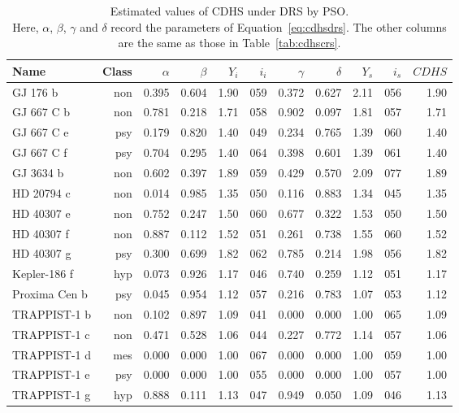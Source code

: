 \documentclass[10pt]{article}
\begin{document}
\begin{table}
  \centering
  \begin{tabular}{l r r r r r r r r r r}
    \toprule
    Name & Class & $\alpha$ & $\beta$ & $Y_i$ & $i_i$ & $\gamma$ & $\delta$ & $Y_s$ & $i_s$ & $\mathit{CDHS}$\\
    \midrule
    GJ 176 b & non & 0.395 & 0.604 & 1.90 & 059 & 0.372 & 0.627 & 2.11 & 056 & 1.90\\
    GJ 667 C b & non & 0.781 & 0.218 & 1.71 & 058 & 0.902 & 0.097 & 1.81 & 057 & 1.71\\
    GJ 667 C e & psy & 0.179 & 0.820 & 1.40 & 049 & 0.234 & 0.765 & 1.39 & 060 & 1.40\\
    GJ 667 C f & psy & 0.704 & 0.295 & 1.40 & 064 & 0.398 & 0.601 & 1.39 & 061 & 1.40\\
    GJ 3634 b & non & 0.602 & 0.397 & 1.89 & 059 & 0.429 & 0.570 & 2.09 & 077 & 1.89\\
    HD 20794 c & non & 0.014 & 0.985 & 1.35 & 050 & 0.116 & 0.883 & 1.34 & 045 & 1.35\\
    HD 40307 e & non & 0.752 & 0.247 & 1.50 & 060 & 0.677 & 0.322 & 1.53 & 050 & 1.50\\
    HD 40307 f & non & 0.887 & 0.112 & 1.52 & 051 & 0.261 & 0.738 & 1.55 & 060 & 1.52\\
    HD 40307 g & psy & 0.300 & 0.699 & 1.82 & 062 & 0.785 & 0.214 & 1.98 & 056 & 1.82\\
    Kepler-186 f & hyp & 0.073 & 0.926 & 1.17 & 046 & 0.740 & 0.259 & 1.12 & 051 & 1.17\\
    Proxima Cen b & psy & 0.045 & 0.954 & 1.12 & 057 & 0.216 & 0.783 & 1.07 & 053 & 1.12\\
    TRAPPIST-1 b & non & 0.102 & 0.897 & 1.09 & 041 & 0.000 & 0.000 & 1.00 & 065 & 1.09\\
    TRAPPIST-1 c & non & 0.471 & 0.528 & 1.06 & 044 & 0.227 & 0.772 & 1.14 & 057 & 1.06\\
    TRAPPIST-1 d & mes & 0.000 & 0.000 & 1.00 & 067 & 0.000 & 0.000 & 1.00 & 059 & 1.00\\
    TRAPPIST-1 e & psy & 0.000 & 0.000 & 1.00 & 055 & 0.000 & 0.000 & 1.00 & 057 & 1.00\\
    TRAPPIST-1 g & hyp & 0.888 & 0.111 & 1.13 & 047 & 0.949 & 0.050 & 1.09 & 046 & 1.13\\
    \bottomrule
  \end{tabular}
  \caption{Estimated values of CDHS under DRS by PSO.\\
    \footnotesize Here, $\alpha$, $\beta$, $\gamma$ and $\delta$ record the parameters of Equation~\ref{eq:cdhsdrs}. The
    other columns are the same as those in Table~\ref{tab:cdhscrs}.
  }\label{tab:cdhsdrs}
\end{table}
\end{document}
